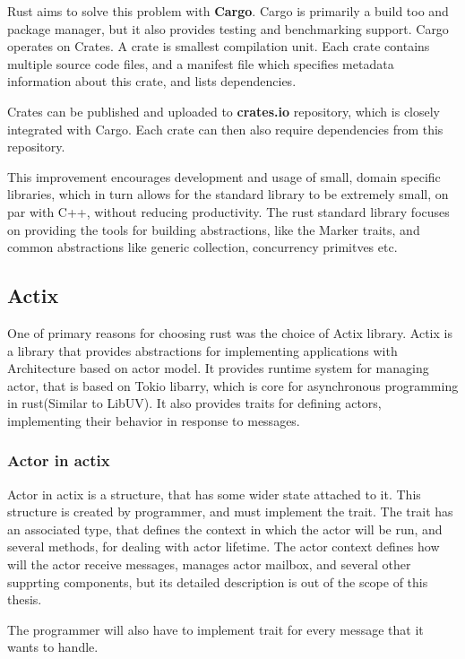 Rust aims to solve this problem with \textbf{Cargo}. Cargo is primarily a build too and package manager, but it also
provides testing and benchmarking support. Cargo operates on Crates. A crate is smallest compilation unit.
Each crate contains multiple source code files, and a manifest file which specifies metadata information about this crate, and lists dependencies.

Crates can be published and uploaded to \textbf{crates.io} repository, which is closely integrated with Cargo. Each crate can then
also require dependencies from this repository.

This improvement encourages development and usage of small, domain specific libraries, which in
turn allows for the standard library to be extremely small, on par with C++, without reducing productivity.
The rust standard library focuses on providing the tools for building abstractions, like the Marker traits,
and common abstractions like generic collection, concurrency primitves etc.

\subsection{Actix}
One of primary reasons for choosing rust was the choice of Actix\cite{web:actix} library. Actix is a library that provides abstractions
for implementing applications with Architecture based on actor model. It provides runtime system for managing actor, that is
based on Tokio libarry, which is core for asynchronous programming in rust(Similar to LibUV). It also provides
traits for defining actors, implementing their behavior in response to messages.

\subsubsection{Actor in actix}
Actor in actix is a structure, that has some wider state attached to it. This structure is created by programmer, and must
implement the  trait. The  trait has an associated type, that defines the context in which the actor will be run,
and several methods, for dealing with actor lifetime.
The actor context defines how will the actor receive messages, manages actor mailbox, and several other
supprting components, but its detailed description is out of the scope of this thesis.

The programmer will also have to implement  trait for every message that it wants to handle.

